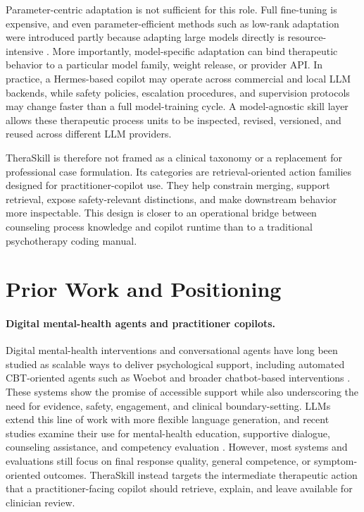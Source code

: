 \documentclass[11pt]{article}
\begin{document}
Parameter-centric adaptation is not sufficient for this role. Full fine-tuning is expensive, and even parameter-efficient methods such as low-rank adaptation were introduced partly because adapting large models directly is resource-intensive \citep{hu2022lora}. More importantly, model-specific adaptation can bind therapeutic behavior to a particular model family, weight release, or provider API. In practice, a Hermes-based copilot may operate across commercial and local LLM backends, while safety policies, escalation procedures, and supervision protocols may change faster than a full model-training cycle. A model-agnostic skill layer allows these therapeutic process units to be inspected, revised, versioned, and reused across different LLM providers.

TheraSkill is therefore not framed as a clinical taxonomy or a replacement for professional case formulation. Its categories are retrieval-oriented action families designed for practitioner-copilot use. They help constrain merging, support retrieval, expose safety-relevant distinctions, and make downstream behavior more inspectable. This design is closer to an operational bridge between counseling process knowledge and copilot runtime than to a traditional psychotherapy coding manual.

\section{Prior Work and Positioning}

\paragraph{Digital mental-health agents and practitioner copilots.}
Digital mental-health interventions and conversational agents have long been studied as scalable ways to deliver psychological support, including automated CBT-oriented agents such as Woebot and broader chatbot-based interventions \citep{fitzpatrick2017woebot,abdAlrazaq2020chatbots,he2023aiConversationalAgents}. These systems show the promise of accessible support while also underscoring the need for evidence, safety, engagement, and clinical boundary-setting. LLMs extend this line of work with more flexible language generation, and recent studies examine their use for mental-health education, supportive dialogue, counseling assistance, and competency evaluation \citep{stade2024opportunities,nguyen2025counselingbench}. However, most systems and evaluations still focus on final response quality, general competence, or symptom-oriented outcomes. TheraSkill instead targets the intermediate therapeutic action that a practitioner-facing copilot should retrieve, explain, and leave available for clinician review.
\end{document}
